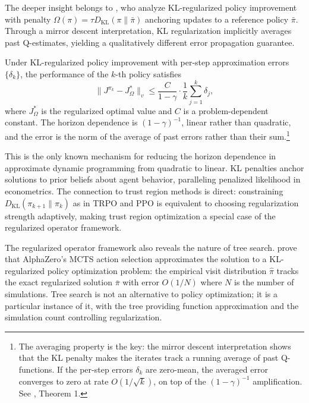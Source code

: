 The deeper insight belongs to \citet{vieillard2020}, who analyze KL-regularized policy improvement with penalty $\Omega(\pi) = \tau D_{\text{KL}}(\pi \| \bar{\pi})$ anchoring updates to a reference policy $\bar{\pi}$. Through a mirror descent interpretation, KL regularization implicitly averages past Q-estimates, yielding a qualitatively different error propagation guarantee.

\begin{theorem}
\label{thm:kl_error}
Under KL-regularized policy improvement with per-step approximation errors $\{\delta_k\}$, the performance of the $k$-th policy satisfies
\[
\|J^{\pi_k} - J^*_\Omega\|_v \leq \frac{C}{1-\gamma} \cdot \frac{1}{k} \sum_{j=1}^{k} \delta_j,
\]
where $J^*_\Omega$ is the regularized optimal value and $C$ is a problem-dependent constant. The horizon dependence is $(1-\gamma)^{-1}$, linear rather than quadratic, and the error is the norm of the average of past errors rather than their sum.\footnote{The averaging property is the key: the mirror descent interpretation shows that the KL penalty makes the iterates track a running average of past Q-functions. If the per-step errors $\delta_k$ are zero-mean, the averaged error converges to zero at rate $O(1/\sqrt{k})$, on top of the $(1-\gamma)^{-1}$ amplification. See \citet{vieillard2020}, Theorem 1.}
\end{theorem}

This is the only known mechanism for reducing the horizon dependence in approximate dynamic programming from quadratic to linear. KL penalties anchor solutions to prior beliefs about agent behavior, paralleling penalized likelihood in econometrics. The connection to trust region methods is direct: constraining $D_{\text{KL}}(\pi_{k+1} \| \pi_k)$ as in TRPO and PPO is equivalent to choosing regularization strength adaptively, making trust region optimization a special case of the regularized operator framework.

The regularized operator framework also reveals the nature of tree search. \citet{grill2020planning} prove that AlphaZero's MCTS action selection approximates the solution to a KL-regularized policy optimization problem: the empirical visit distribution $\hat{\pi}$ tracks the exact regularized solution $\bar{\pi}$ with error $O(1/N)$ where $N$ is the number of simulations. Tree search is not an alternative to policy optimization; it is a particular instance of it, with the tree providing function approximation and the simulation count controlling regularization.


